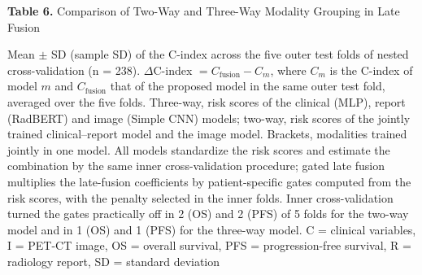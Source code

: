 \documentclass[border=8pt]{standalone}
\newif\ifshowtitle \showtitletrue
\newif\ifshownotes \shownotestrue
\begin{document}
\sbox{}%
\begin{minipage}{\wd\tablebox}
\ifshowtitle\noindent \textbf{Table 6.} Comparison of Two-Way and Three-Way Modality Grouping in Late Fusion\par\vspace{4pt}\fi
\noindent\usebox\tablebox
\ifshownotes\par\vspace{3pt}\footnotesize\noindent Mean $\pm$ SD (sample SD) of the C-index across the five outer test folds of nested cross-validation (n = 238). $\Delta$C-index $= C_{\mathrm{fusion}} - C_{m}$, where $C_{m}$ is the C-index of model $m$ and $C_{\mathrm{fusion}}$ that of the proposed model in the same outer test fold, averaged over the five folds. Three-way, risk scores of the clinical (MLP), report (RadBERT) and image (Simple CNN) models; two-way, risk scores of the jointly trained clinical--report model and the image model. Brackets, modalities trained jointly in one model. All models standardize the risk scores and estimate the combination by the same inner cross-validation procedure; gated late fusion multiplies the late-fusion coefficients by patient-specific gates computed from the risk scores, with the penalty selected in the inner folds. Inner cross-validation turned the gates practically off in 2 (OS) and 2 (PFS) of 5 folds for the two-way model and in 1 (OS) and 1 (PFS) for the three-way model. C = clinical variables, I = PET-CT image, OS = overall survival, PFS = progression-free survival, R = radiology report, SD = standard deviation\par\fi
\end{minipage}
\end{document}

